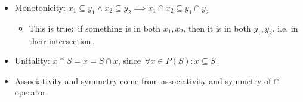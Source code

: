 \begin{itemize}
    \item Monotonicity: $x_1 \subseteq y_1 \land x_2 \subseteq y_2 \implies x_1 \cap x_2 \subseteq y_1 \cap y_2$
          \begin{itemize}
            \item This is true: \,if something is in both $x_1,x_2$, then it is in both $y_1,y_2$, i.e. in their intersection\,.
          \end{itemize}
    \item Unitality: $x \cap S = x = S \cap x$, since \,$\forall x \in P(S): x \subseteq S$\,.
    \item Associativity and symmetry come from associativity and symmetry of $\cap$ operator.
  \end{itemize}
